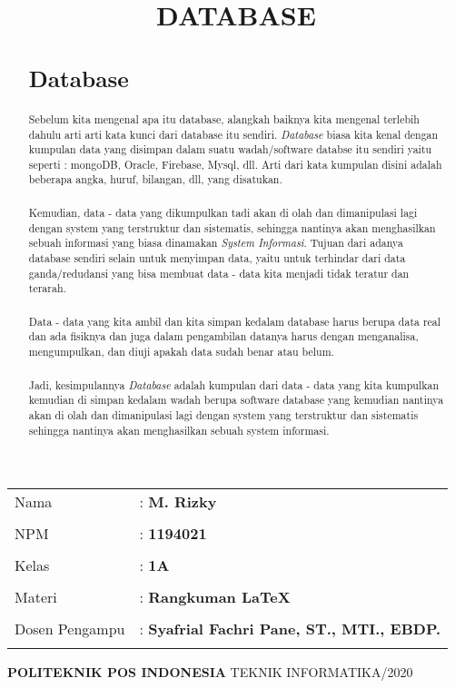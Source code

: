 \documentclass[10pt]{article}
\title{DATABASE}
\author{}
\begin{document}
\maketitle
\begin{center}
\begin{tabular}{ll}
Nama 				&: \textbf {M. Rizky}\tabularnewline\\
NPM       			&: \textbf {1194021}\tabularnewline\\
Kelas 				&: \textbf {1A}\tabularnewline\\
Materi 				&: \textbf {Rangkuman LaTeX}\tabularnewline\\
Dosen Pengampu		&: \textbf {Syafrial Fachri Pane, ST., MTI., EBDP.}\tabularnewline\\
\end{tabular}
\newline
\newline
\newline
\newline
\newline
\newline
\newline
\textbf {POLITEKNIK POS INDONESIA} \linebreak
TEKNIK INFORMATIKA/2020
\end{center}
\newpage
\begin{abstract}
\section{Database}
\subparagraph{} Sebelum kita mengenal apa itu database, alangkah baiknya kita mengenal terlebih dahulu arti arti kata kunci dari database itu sendiri. \emph {Database} biasa kita kenal dengan kumpulan data yang disimpan dalam suatu wadah/software databse itu sendiri yaitu seperti : mongoDB, Oracle, Firebase, Mysql, dll. Arti dari kata kumpulan disini adalah beberapa angka, huruf, bilangan, dll, yang disatukan.
\subparagraph{} Kemudian, data - data yang dikumpulkan tadi akan di olah dan dimanipulasi lagi dengan system yang terstruktur dan sistematis, sehingga nantinya akan menghasilkan sebuah informasi yang biasa dinamakan \emph {System Informasi}. Tujuan dari adanya database sendiri selain untuk menyimpan data, yaitu untuk terhindar dari data ganda/redudansi yang bisa membuat data - data kita menjadi tidak teratur dan terarah.
\subparagraph{} Data - data yang kita ambil dan kita simpan kedalam database harus berupa data real dan ada fisiknya dan juga dalam pengambilan datanya harus dengan menganalisa, mengumpulkan, dan diuji apakah data sudah benar atau belum.
\subparagraph{} Jadi, kesimpulannya \emph {Database} adalah kumpulan dari data - data yang kita kumpulkan kemudian di simpan kedalam wadah berupa software database yang kemudian nantinya akan di olah dan dimanipulasi lagi dengan system yang terstruktur dan sistematis sehingga nantinya akan menghasilkan sebuah system informasi.
 
\end{abstract}
\end{document}
